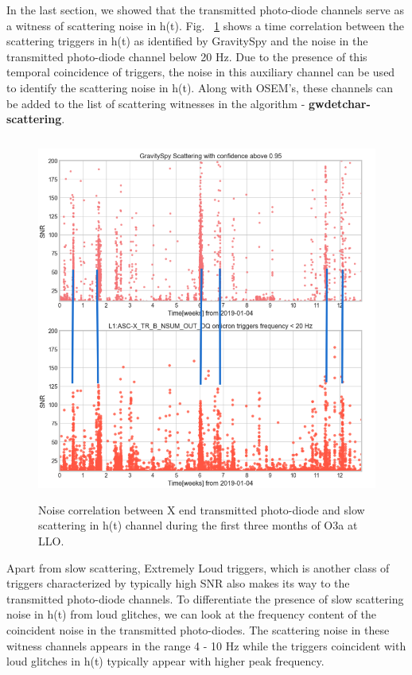 \documentclass[12pt]{iopart}
\begin{document}
In the last section, we showed that the transmitted photo-diode channels serve as a witness of scattering noise in h(t). Fig. ~\ref{fig:transetmx} shows a time correlation between the scattering triggers in h(t) as identified by GravitySpy and the noise in the transmitted photo-diode channel below 20 Hz. Due to the presence of this temporal coincidence of triggers, the noise in this auxiliary channel can be used to identify the scattering noise in h(t). Along with OSEM’s, these channels can be added to the list of scattering witnesses in the algorithm - \textbf{gwdetchar-scattering}.

\begin{figure}[h]
  \centering
         \includegraphics[width = 14cm,height=12cm]{htxtrb_corr2.png}
         \caption{Noise correlation between X end transmitted photo-diode and slow scattering in h(t) channel during the first three months of O3a at LLO. }
    \label{fig:transetmx}
\end{figure}

Apart from slow scattering, Extremely Loud triggers, which is another class of triggers characterized by typically high SNR also makes its way to the transmitted photo-diode channels. To differentiate the presence of slow scattering noise in h(t) from loud glitches, we can look at the frequency content of the coincident noise in the transmitted photo-diodes. The scattering noise in these witness channels appears in the range  4 - 10 Hz while the triggers coincident with loud glitches in h(t) typically appear with higher peak frequency. 
\end{document}
